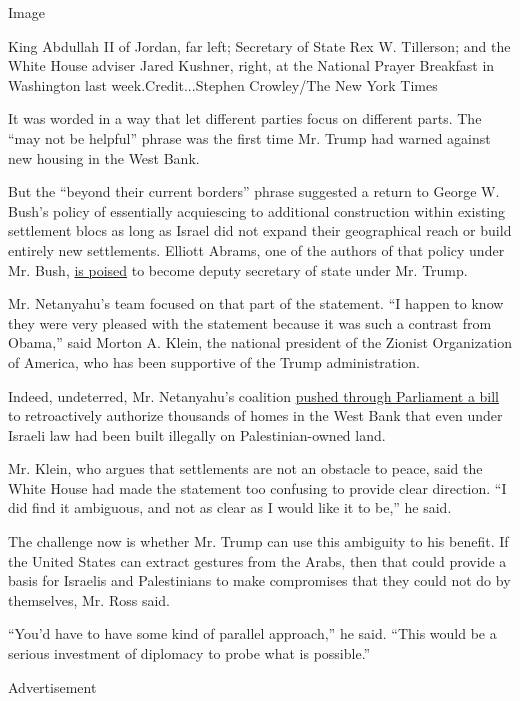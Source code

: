 Image

King Abdullah II of Jordan, far left; Secretary of State Rex W.
Tillerson; and the White House adviser Jared Kushner, right, at the
National Prayer Breakfast in Washington last week.Credit...Stephen
Crowley/The New York Times

It was worded in a way that let different parties focus on different
parts. The ``may not be helpful'' phrase was the first time Mr. Trump
had warned against new housing in the West Bank.

But the ``beyond their current borders'' phrase suggested a return to
George W. Bush's policy of essentially acquiescing to additional
construction within existing settlement blocs as long as Israel did not
expand their geographical reach or build entirely new settlements.
Elliott Abrams, one of the authors of that policy under Mr. Bush,
\href{https://www.nytimes3xbfgragh.onion/2017/02/06/us/politics/donald-trump-elliott-abrams.html}{is
poised} to become deputy secretary of state under Mr. Trump.

Mr. Netanyahu's team focused on that part of the statement. ``I happen
to know they were very pleased with the statement because it was such a
contrast from Obama,'' said Morton A. Klein, the national president of
the Zionist Organization of America, who has been supportive of the
Trump administration.

Indeed, undeterred, Mr. Netanyahu's coalition
\href{https://www.nytimes3xbfgragh.onion/2017/02/06/world/middleeast/israel-settlement-law-palestinians-west-bank.html}{pushed
through Parliament a bill} to retroactively authorize thousands of homes
in the West Bank that even under Israeli law had been built illegally on
Palestinian-owned land.

Mr. Klein, who argues that settlements are not an obstacle to peace,
said the White House had made the statement too confusing to provide
clear direction. ``I did find it ambiguous, and not as clear as I would
like it to be,'' he said.

The challenge now is whether Mr. Trump can use this ambiguity to his
benefit. If the United States can extract gestures from the Arabs, then
that could provide a basis for Israelis and Palestinians to make
compromises that they could not do by themselves, Mr. Ross said.

``You'd have to have some kind of parallel approach,'' he said. ``This
would be a serious investment of diplomacy to probe what is possible.''

Advertisement

